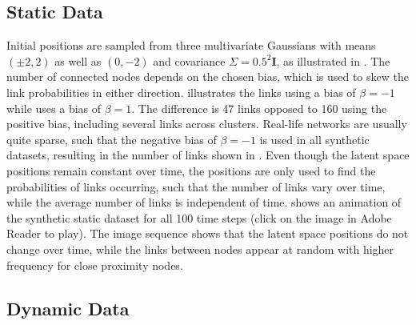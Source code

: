     \subsection{Static Data}
    
        Initial positions are sampled from three multivariate Gaussians with means $(\pm2,2)$ as well as $(0,-2)$ and covariance $\Sigma=0.5^2\bm{I}$, as illustrated in . 
        The number of connected nodes depends on the chosen bias, which is used to skew the link probabilities in either direction.  illustrates the links using a bias of $\beta=-1$ while  uses a bias of $\beta=1$. The difference is 47 links opposed to 160 using the positive bias, including several links across clusters. 
        Real-life networks are usually quite sparse, such that the negative bias of $\beta=-1$ is used in all synthetic datasets, resulting in the number of links shown in . Even though the latent space positions remain constant over time, the positions are only used to find the probabilities of links occurring, such that the number of links vary over time, while the average number of links is independent of time.
         shows an animation of the synthetic static dataset for all 100 time steps (click on the image in Adobe Reader to play). The image sequence shows that the latent space positions do not change over time, while the links between nodes appear at random with higher frequency for close proximity nodes.
    
    \subsection{Dynamic Data}
    
